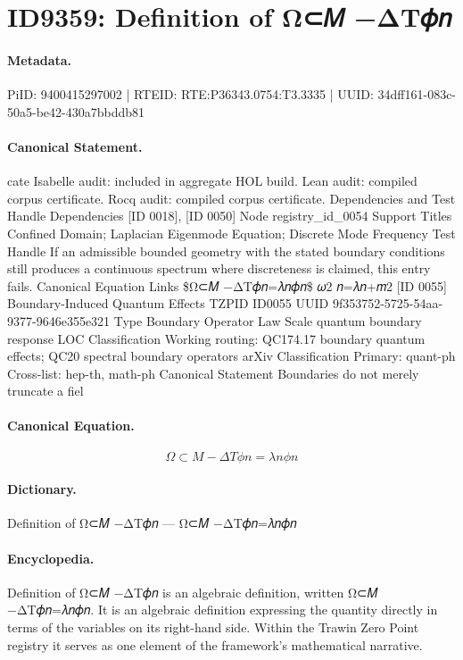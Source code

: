 \section*{ID9359: Definition of Ω⊂𝑀 −ΔT𝜙𝑛}
\paragraph{Metadata.}
PiID: 9400415297002 | RTEID: RTE:P36343.0754:T3.3335 | UUID: 34dff161-083c-50a5-be42-430a7bbddb81

\paragraph{Canonical Statement.}
cate Isabelle audit: included in aggregate HOL build. Lean audit: compiled corpus certificate. Rocq audit: compiled corpus certificate. Dependencies and Test Handle Dependencies [ID 0018], [ID 0050] Node registry\_id\_0054 Support Titles Confined Domain; Laplacian Eigenmode Equation; Discrete Mode Frequency Test Handle If an admissible bounded geometry with the stated boundary conditions still produces a continuous spectrum where discreteness is claimed, this entry fails. Canonical Equation Links \$Ω⊂𝑀 −ΔT𝜙𝑛=𝜆𝑛𝜙𝑛\$ 𝜔2 𝑛=𝜆𝑛+𝑚2 [ID 0055] Boundary-Induced Quantum Effects TZPID ID0055 UUID 9f353752-5725-54aa-9377-9646e355e321 Type Boundary Operator Law Scale quantum boundary response LOC Classification Working routing: QC174.17 boundary quantum effects; QC20 spectral boundary operators arXiv Classification Primary: quant-ph Cross-list: hep-th, math-ph Canonical Statement Boundaries do not merely truncate a fiel

\paragraph{Canonical Equation.}
\[
Ω⊂𝑀 −ΔT𝜙𝑛=𝜆𝑛𝜙𝑛
\]

\paragraph{Dictionary.}
Definition of Ω⊂𝑀 −ΔT𝜙𝑛 — Ω⊂𝑀 −ΔT𝜙𝑛=𝜆𝑛𝜙𝑛

\paragraph{Encyclopedia.}
Definition of Ω⊂𝑀 −ΔT𝜙𝑛 is an algebraic definition, written Ω⊂𝑀 −ΔT𝜙𝑛=𝜆𝑛𝜙𝑛. It is an algebraic definition expressing the quantity directly in terms of the variables on its right-hand side. Within the Trawin Zero Point registry it serves as one element of the framework's mathematical narrative.
